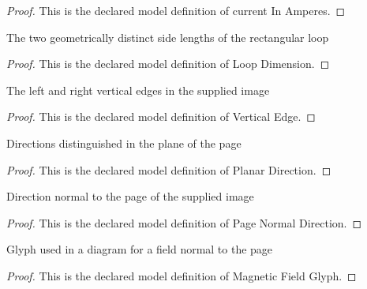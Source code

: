 \begin{proof}
  This is the declared model definition of current In Amperes.
\end{proof}
\begin{definition}
  \label{def:physics:phyx-mini-0973:phyxminiproblems-problemphyxmini0973-loopdimension}
  The two geometrically distinct side lengths of the rectangular loop
\end{definition}
\begin{proof}
  This is the declared model definition of Loop Dimension.
\end{proof}
\begin{definition}
  \label{def:physics:phyx-mini-0973:phyxminiproblems-problemphyxmini0973-verticaledge}
  The left and right vertical edges in the supplied image
\end{definition}
\begin{proof}
  This is the declared model definition of Vertical Edge.
\end{proof}
\begin{definition}
  \label{def:physics:phyx-mini-0973:phyxminiproblems-problemphyxmini0973-planardirection}
  Directions distinguished in the plane of the page
\end{definition}
\begin{proof}
  This is the declared model definition of Planar Direction.
\end{proof}
\begin{definition}
  \label{def:physics:phyx-mini-0973:phyxminiproblems-problemphyxmini0973-pagenormaldirection}
  Direction normal to the page of the supplied image
\end{definition}
\begin{proof}
  This is the declared model definition of Page Normal Direction.
\end{proof}
\begin{definition}
  \label{def:physics:phyx-mini-0973:phyxminiproblems-problemphyxmini0973-magneticfieldglyph}
  Glyph used in a diagram for a field normal to the page
\end{definition}
\begin{proof}
  This is the declared model definition of Magnetic Field Glyph.
\end{proof}
